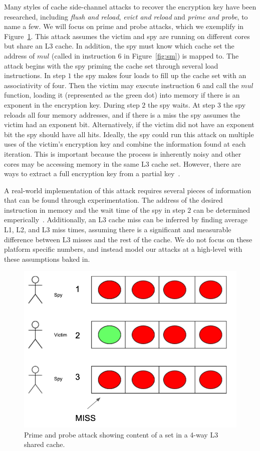 \documentclass[12pt]{article}
\begin{document}
Many styles of cache side-channel attacks to recover the encryption key have been researched, including {\it flush and reload}, {\it evict and reload} and {\it prime and probe}, to name a few. 
We will focus on prime and probe attacks, which we exemplify in Figure~\ref{fig:pp}.
This attack assumes the victim and spy are running on different cores but share an L3 cache.
In addition, the spy must know which cache set the address of $mul$ (called in instruction $6$ in Figure~\ref{fig:sm}) is mapped to.
The attack begins with the spy priming the cache set through several load instructions.
In step $1$ the spy makes four loads to fill up the cache set with an associativity of four.
Then the victim may execute instruction $6$ and call the $mul$ function, loading it (represented as the green dot) into memory if there is an exponent in the encryption key.
During step $2$ the spy waits.
At step $3$ the spy reloads all four memory addresses, and if there is a miss the spy assumes the victim had an exponent bit.
Alternatively, if the victim did not have an exponent bit the spy should have all hits.
Ideally, the spy could run this attack on multiple uses of the victim's encryption key and combine the information found at each iteration.
This is important because the process is inherently noisy and other cores may be accessing memory in the same L3 cache set.
However, there are ways to extract a full encryption key from a partial key~\cite{partKey}.

A real-world implementation of this attack requires several pieces of information that can be found through experimentation.
The address of the desired instruction in memory and the wait time of the spy in step $2$ can be determined emperically~\cite{waitTime}.
Additionally, an L3 cache miss can be inferred by finding average L1, L2, and L3 miss times,
assuming there is a significant and measurable difference between L3 misses and the rest of the cache.
We do not focus on these platform specific numbers, and instead model our attacks at a high-level with these assumptions baked in.

\begin{figure}[t]
\centering
\includegraphics[scale=0.8]{../presentation/cattack.png}
\caption{Prime and probe attack showing content of a set in a 4-way L3 shared cache.}
\label{fig:pp}
\end{figure}
\end{document}
